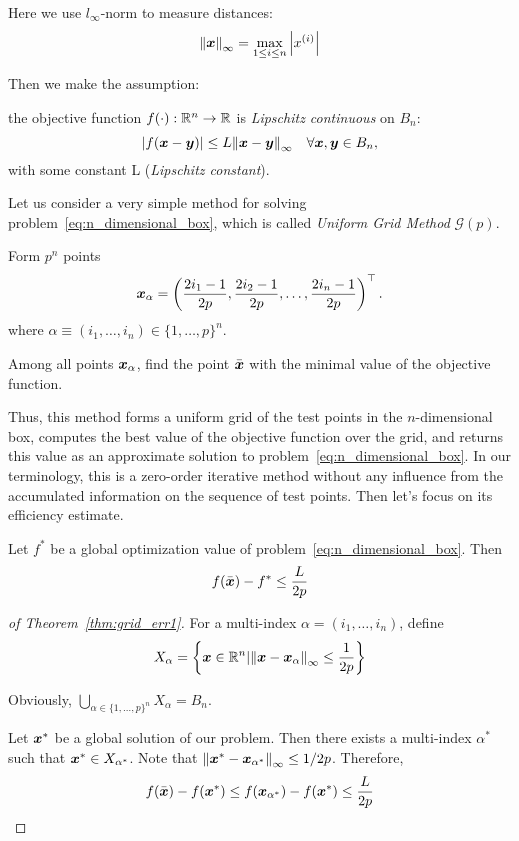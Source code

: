 Here we use \(l_\infty\)-norm to measure distances:
\[
    \norm{\boldsymbol{x}}_{\infty} = \max_{1 \le i \le n} \abs{x^{(i)}}  
\]

Then we make the assumption:
\begin{assum}\label{assum:lipschitz_objective_func}
    the objective function \(f(\cdot): \mathbb{R}^n \to \mathbb{R}\) is \emph{Lipschitz continuous} on \(B_n\):
    \[
        \abs{f(\boldsymbol{x} - \boldsymbol{y})} \le L \norm{\boldsymbol{x} - \boldsymbol{y}}_{\infty} \quad \forall \boldsymbol{x},\boldsymbol{y} \in B_n,
    \]
    with some constant L (\emph{Lipschitz constant}).
\end{assum}

Let us consider a very simple method for solving problem~\ref{eq:n_dimensional_box}, 
which is called \emph{Uniform Grid Method} \(\mathscr{G}(p)\).
\begin{algorithm}[!htbp]
\caption{Uniform Grid Method \(\mathscr{G}(p)\)}\label{alg:uniform_grid_method}
    Form \(p^n\) points
    \[
        \boldsymbol{x}_\alpha = \left( \frac{2i_1 - 1}{2p}, \frac{2i_2 - 1}{2p}, \dots, \frac{2i_n - 1}{2p} \right)^\top.  
    \]
    where \(\alpha \equiv (i_1, \dots, i_n) \in \{1, \dots, p\}^n\).
    
    Among all points \(\boldsymbol{x}_\alpha\), find the point \(\bar{\boldsymbol{x}}\) with the minimal value of the objective function.
\end{algorithm}

Thus, this method forms a uniform grid of the test points in the \(n\)-dimensional box, 
computes the best value of the objective function over the grid, and returns this value 
as an approximate solution to problem~\ref{eq:n_dimensional_box}. In our terminology, 
this is a zero-order iterative method without any influence from the accumulated information 
on the sequence of test points. Then let's focus on its efficiency estimate.

\begin{thm}\label{thm:grid_err1}
    Let \(f^*\) be a global optimization value of problem~\ref{eq:n_dimensional_box}. Then
    \[
        f(\bar{\boldsymbol{x}}) - f^* \le \frac{L}{2p}  
    \]
\end{thm}

\begin{proof}[of Theorem~\ref{thm:grid_err1}]
    For a multi-index \(\alpha = (i_1, \dots, i_n)\), define
    \[
        X_\alpha = \left\{ \boldsymbol{x} \in \mathbb{R}^n \arrowvert \norm{\boldsymbol{x} - \boldsymbol{x}_\alpha}_{\infty} \le \frac{1}{2p} \right\}
    \]

    Obviously, \(\bigcup_{\alpha \in \{1, \dots, p\}^n} X_\alpha = B_n\).

    Let \(\boldsymbol{x}^*\) be a global solution of our problem. Then there exists a multi-index \(\alpha^*\) 
    such that \(\boldsymbol{x}^* \in X_{\alpha^*}\). Note that \(\norm{\boldsymbol{x}^* - \boldsymbol{x}_{\alpha^*}}_{\infty} \le 1/2p\). 
    Therefore,
    \[
        f(\bar{\boldsymbol{x}}) - f(\boldsymbol{x}^*) \le f(\boldsymbol{x}_{\alpha^*}) - f(\boldsymbol{x}^*) \le \frac{L}{2p}
    \]
\end{proof}

